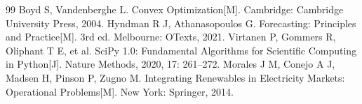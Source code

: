 
\begin{thebibliography}{99}
 Boyd S, Vandenberghe L. Convex Optimization[M]. Cambridge: Cambridge University Press, 2004.
 Hyndman R J, Athanasopoulos G. Forecasting: Principles and Practice[M]. 3rd ed. Melbourne: OTexts, 2021.
 Virtanen P, Gommers R, Oliphant T E, et al. SciPy 1.0: Fundamental Algorithms for Scientific Computing in Python[J]. Nature Methods, 2020, 17: 261--272.
 Morales J M, Conejo A J, Madsen H, Pinson P, Zugno M. Integrating Renewables in Electricity Markets: Operational Problems[M]. New York: Springer, 2014.
\end{thebibliography}
